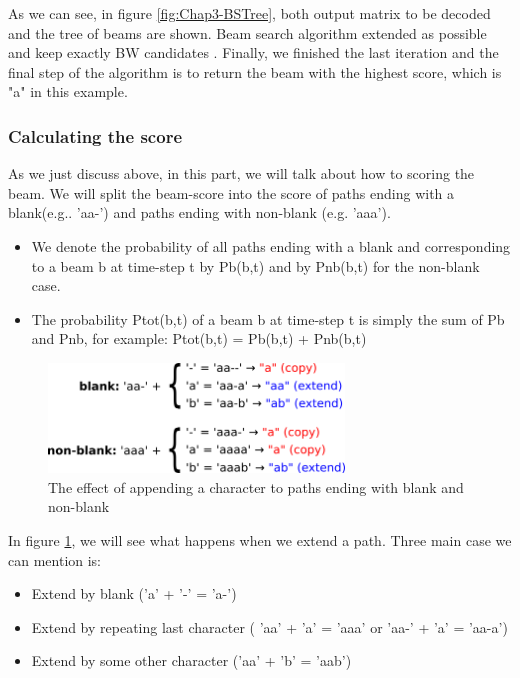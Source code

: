 As we can see, in figure \ref{fig:Chap3-BSTree}, both output matrix to be decoded and the tree of beams are shown. 
Beam search algorithm extended as possible and keep exactly BW candidates . Finally,
we finished the last iteration and the final step of the algorithm is to return the beam 
with the highest score, which is "a" in this example.
      
\subsubsection{ Calculating the score }
As we just discuss above, in this part, we will talk about how to scoring the beam.
We will split the beam-score into the score of paths ending with a blank(e.g.. 'aa-')
and paths ending with non-blank (e.g. 'aaa'). 
\begin{itemize}
	\item We denote the probability of all paths ending with a blank and corresponding to a beam b at time-step t 
	      by Pb(b,t) and by Pnb(b,t) for the non-blank case.
	\item The probability Ptot(b,t) of a beam b at time-step t is simply the sum of Pb and Pnb, for example:
	      Ptot(b,t) = Pb(b,t) + Pnb(b,t)
\end{itemize}

\begin{figure}[H]
	\centering
	\includegraphics[width=0.7\textwidth]{img/Chap3/CTC_Scoring}
	\caption{ The effect of appending a character to paths ending with blank and non-blank }
	\label{fig:Chap3-CTC_Scoring}
\end{figure}

In figure \ref{fig:Chap3-CTC_Scoring}, we will see what happens when we extend a path. Three main case we can mention
is:
\begin{itemize}
	\item Extend by blank ('a' + '-' = 'a-')
	\item Extend by repeating last character ( 'aa' + 'a' = 'aaa' or 'aa-' + 'a' = 'aa-a')
	\item Extend by some other character ('aa' + 'b' = 'aab')
\end{itemize}

